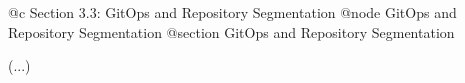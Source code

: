 @c Section 3.3: GitOps and Repository Segmentation
@node GitOps and Repository Segmentation
@section GitOps and Repository Segmentation

(...)
